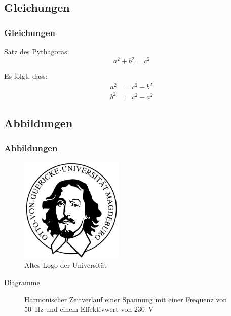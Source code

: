 \documentclass[aspectratio=43]{beamer} 	%
\begin{document}
\subsection{Gleichungen}

\begin{frame}
	\frametitle<presentation>{Gleichungen}
	\begin{block}{Satz des Pythagoras:}
		\begin{equation}
			a^2 + b^2 = c^2 \label{eq:pythogoras}
		\end{equation}	\end{block}
	\begin{block}{Es folgt, dass:}
		\begin{align}
			a^2 &= c^2 - b^2 \\
			b^2 &= c^2 - a^2
		\end{align} 	
 	\end{block}
\end{frame}

\subsection{Abbildungen}

\begin{frame}
	\frametitle<presentation>{Abbildungen}
	\begin{figure}[!t]
		\centering
			\includegraphics[height=5cm]{bilder/unilogo}
		\caption{Altes Logo der Universität}
		\label{fig:unilogo}
	\end{figure}
\end{frame}

\begin{frame}{Diagramme}
	\begin{figure}[!t]
		\centering
		\caption{Harmonischer Zeitverlauf einer Spannung mit einer Frequenz von \SI{50}{\hertz} und einem Effektivwert von \SI{230}{\volt}}
		\label{fig:u_t_sinus}
	\end{figure}
\end{frame}
\end{document}
